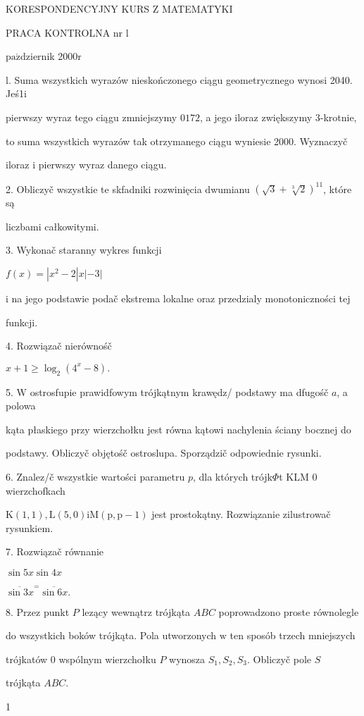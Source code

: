 \documentclass[a4paper,12pt]{article}
\begin{document}
KORESPONDENCYJNY KURS Z MATEMATYKI

PRACA KONTROLNA nr l

$\mathrm{p}\mathrm{a}\acute{\mathrm{z}}$dziernik 2$000\mathrm{r}$

l. Suma wszystkich wyrazów nieskończonego ciągu geometrycznego wynosi 2040. Jeś1i

pierwszy wyraz tego ciągu zmniejszymy $0172$, a jego iloraz zwiększymy 3-krotnie,

to suma wszystkich wyrazów tak otrzymanego ciągu wyniesie 2000. Wyznaczyč

iloraz $\mathrm{i}$ pierwszy wyraz danego ciągu.

2. Obliczyč wszystkie te skfadniki rozwinięcia dwumianu $(\sqrt{3}+\sqrt[3]{2})^{11}$, które są

liczbami całkowitymi.

3. Wykonač staranny wykres funkcji

$f(x)=|x^{2}-2|x|-3|$

i na jego podstawie podač ekstrema lokalne oraz przedzialy monotoniczności tej

funkcji.

4. Rozwiązač nierównośč

$x+1\geq\log_{2}(4^{x}-8).$

5. $\mathrm{W}$ ostrosfupie prawidfowym trójkątnym krawędz/ podstawy ma dfugośč $a$, a polowa

kąta płaskiego przy wierzchołku jest równa kątowi nachylenia ściany bocznej do

podstawy. Obliczyč objętośč ostroslupa. Sporządzič odpowiednie rysunki.

6. Znalez/č wszystkie wartości parametru $p$, dla których trójk$\Phi$t KLM $0$ wierzchofkach

$\mathrm{K}(1,1), \mathrm{L}(5,0)\mathrm{i}\mathrm{M}(\mathrm{p},\mathrm{p}-1)$ jest prostokątny. Rozwiązanie zilustrowač rysunkiem.

7. Rozwiązač równanie

$\sin 5x\sin 4x$

$\overline{\sin 3x}^{=}\overline{\sin 6x}.$

8. Przez punkt $P$ lezący wewnątrz trójkąta $ABC$ poprowadzono proste równolegle

do wszystkich boków trójkąta. Pola utworzonych $\mathrm{w}$ ten sposób trzech mniejszych

trójkatów $0$ wspólnym wierzchołku $P$ wynosza $S_{1}, S_{2}, S_{3}$. Obliczyč pole $S$

trójkąta $ABC.$

1
\end{document}
